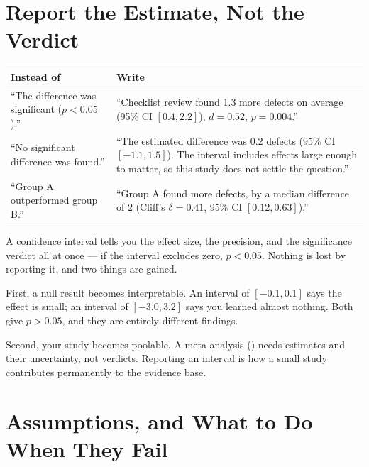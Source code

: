 \section{Report the Estimate, Not the Verdict}

\begin{center}
\small
\begin{tabular}{@{}L{6.6cm}L{7.7cm}@{}}
\toprule
\textbf{Instead of} & \textbf{Write} \\
\midrule
``The difference was significant ($p < 0.05$).''
  & ``Checklist review found 1.3 more defects on average (95\% CI $[0.4,
    2.2]$), $d = 0.52$, $p = 0.004$.'' \\
``No significant difference was found.''
  & ``The estimated difference was 0.2 defects (95\% CI $[-1.1, 1.5]$). The
    interval includes effects large enough to matter, so this study does not
    settle the question.'' \\
``Group A outperformed group B.''
  & ``Group A found more defects, by a median difference of 2 (Cliff's $\delta
    = 0.41$, 95\% CI $[0.12, 0.63]$).'' \\
\bottomrule
\end{tabular}
\end{center}

\begin{conceptbox}
A confidence interval tells you the effect size, the precision, and the
significance verdict all at once --- if the interval excludes zero, $p < 0.05$.
Nothing is lost by reporting it, and two things are gained.

\medskip
First, a null result becomes interpretable. An interval of $[-0.1, 0.1]$ says
the effect is small; an interval of $[-3.0, 3.2]$ says you learned almost
nothing. Both give $p > 0.05$, and they are entirely different findings.

\medskip
Second, your study becomes poolable. A meta-analysis () needs
estimates and their uncertainty, not verdicts. Reporting an interval is how a
small study contributes permanently to the evidence base.
\end{conceptbox}

\section{Assumptions, and What to Do When They Fail}

